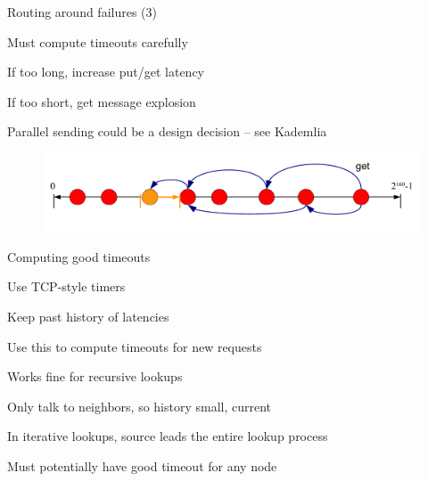 \begin{frame}{Routing around failures (3)}

\BIL
\item Must compute timeouts carefully
\BI
\item If too long, increase put/get latency
\item If too short, get message explosion
\EI
\item Parallel sending could be a design decision -- see Kademlia
\EIL

\begin{figure}
	\includegraphics[width=\textwidth]{dht-route-failure3}
\end{figure}

\end{frame}

\begin{frame}{Computing good timeouts}
	
\BIL
\item Use TCP-style timers
	\BI
	\item Keep past history of latencies
	\item Use this to compute timeouts for new requests
	\EI
\item Works fine for recursive lookups
	\BI
	\item Only talk to neighbors, so history small, current
	\EI
\item In iterative lookups, source leads the  entire lookup process
	\BI
	\item Must potentially have good timeout for any node
	\EI
\EIL

\end{frame}

